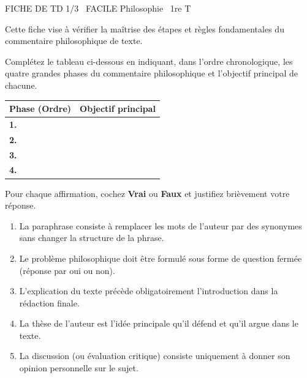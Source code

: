 \documentclass[11pt]{article}
\begin{document}
\begin{tcolorbox}[enhanced,colback=popink,colframe=popink,arc=10pt,boxrule=0pt,left=12pt,right=12pt,top=9pt,bottom=9pt]
{\color{white}\popxbold\small FICHE DE TD 1/3 \textbullet\ FACILE \hfill Philosophie \textbullet\ 1re T\par}
\end{tcolorbox}
\vspace{4pt}
\noindent Cette fiche vise à vérifier la maîtrise des étapes et règles fondamentales du commentaire philosophique de texte.

\begin{exercice}
\noindent Complétez le tableau ci-dessous en indiquant, dans l'ordre chronologique, les quatre grandes phases du commentaire philosophique et l'objectif principal de chacune.
\begin{tabularx}{\linewidth}{|>{\bfseries}X|X|}
\hline
\textbf{Phase (Ordre)} & \textbf{Objectif principal} \\ \hline
1. & \\ \hline
2. & \\ \hline
3. & \\ \hline
4. & \\ \hline
\end{tabularx}
\end{exercice}

\begin{exercice}
\noindent Pour chaque affirmation, cochez \textbf{Vrai} ou \textbf{Faux} et justifiez brièvement votre réponse.
\begin{enumerate}
    \item La paraphrase consiste à remplacer les mots de l'auteur par des synonymes sans changer la structure de la phrase.
    \item Le problème philosophique doit être formulé sous forme de question fermée (réponse par oui ou non).
    \item L'explication du texte précède obligatoirement l'introduction dans la rédaction finale.
    \item La thèse de l'auteur est l'idée principale qu'il défend et qu'il argue dans le texte.
    \item La discussion (ou évaluation critique) consiste uniquement à donner son opinion personnelle sur le sujet.
\end{enumerate}
\end{exercice}
\end{document}
